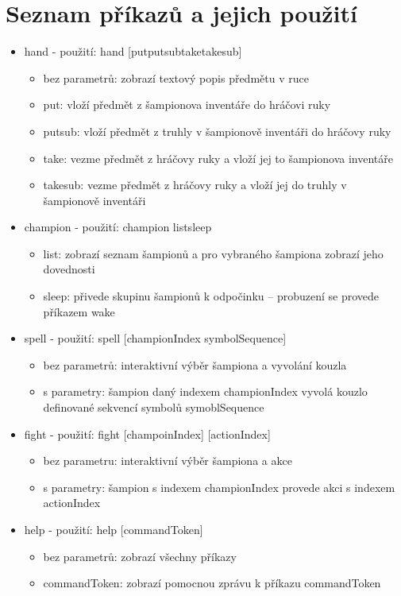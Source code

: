 \section{Seznam příkazů a jejich použití}
\begingroup
{}\selectfont
\begin{itemize}
\item hand - použití: hand [put\textpipe putsub\textpipe take\textpipe takesub]
	\begin{itemize}
	\item bez parametrů:  zobrazí textový popis předmětu v ruce
	\item put: vloží předmět z šampionova inventáře do hráčovi ruky 
	\item putsub: vloží předmět z truhly v šampionově inventáři do hráčovy ruky
	\item take: vezme předmět z hráčovy ruky a vloží jej to šampionova inventáře 
	\item takesub: vezme předmět z hráčovy ruky a vloží jej do truhly v šampionově inventáři 
	\end{itemize}

\item champion - použití: champion list\textpipe sleep
	\begin{itemize}
	\item list: zobrazí seznam šampionů a pro vybraného šampiona zobrazí jeho dovednosti 
	\item sleep: přivede skupinu šampionů k odpočinku -- probuzení se provede příkazem wake
	\end{itemize}

\item spell - použití: spell [championIndex symbolSequence]
	\begin{itemize}
	\item bez parametrů: interaktivní výběr šampiona a vyvolání kouzla
	\item s parametry: šampion daný indexem championIndex vyvolá kouzlo  definované sekvencí symbolů symoblSequence
	\end{itemize}

\item fight - použití: fight [champoinIndex] [actionIndex] 
	\begin{itemize}
	\item bez parametru: interaktivní výběr šampiona a akce
	\item s parametry: šampion s indexem championIndex provede akci s indexem actionIndex
	\end{itemize}

\item help - použití: help [commandToken]
	\begin{itemize}
	\item bez parametrů: zobrazí všechny příkazy 
	\item commandToken: zobrazí pomocnou zprávu k příkazu commandToken 
	\end{itemize}
\end{itemize}

